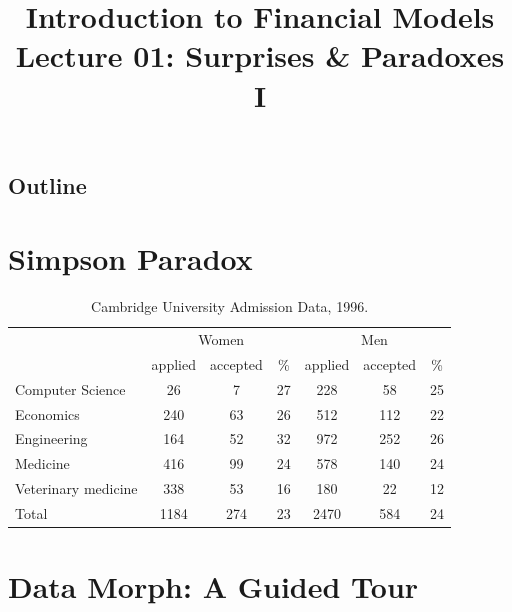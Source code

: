 \documentclass[10pt]{beamer}
\title{Introduction to Financial Models \\ Lecture 01: Surprises \& Paradoxes I}
\author{}
\date{}
\begin{document}
\begin{frame}
\titlepage
\end{frame}

\subsection*{Outline}
\begin{frame}
  \tableofcontents
\end{frame}

\section{Simpson Paradox}

\begin{frame}
\begin{table}[!htbp]
  \centering
  \begin{tabular}{lcccccc}
    \toprule
    & \multicolumn{3}{c}{Women} & \multicolumn{3}{c}{Men} \\
    & applied & accepted & \% & applied & accepted & \% \\
    \midrule
    Computer Science & 26 & 7 & 27 & 228 & 58 & 25 \\
    Economics & 240 & 63 & 26 & 512 & 112 & 22 \\
    Engineering & 164 & 52 & 32 & 972 & 252 & 26 \\
    Medicine & 416 & 99 & 24 & 578 & 140 & 24 \\
    Veterinary medicine & 338 & 53 & 16 & 180 & 22 & 12 \\
    \midrule
    Total & 1184 & 274 & 23 & 2470 & 584 & 24 \\
    \bottomrule
  \end{tabular}
  \caption{Cambridge University Admission Data, 1996.}
  \label{fig:simpson}
\end{table}
\end{frame}

\section{Data Morph: A Guided Tour}
\end{document}

